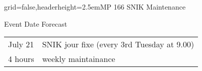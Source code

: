 \documentclass[english]{kiesgrube}
\begin{document}
\begin{poster}{grid=false,headerheight=2.5em}{}{MP 166 SNIK Maintenance}{}{}
\begin{posterbox}[name=event,column=1,below=open]{Event Date Forecast}
\begin{tabulary}{\textwidth}{lL}
July 21		&SNIK jour fixe	(every 3rd Tuesday at 9.00)\\
4 hours		&weekly maintainance\\
\end{tabulary}
\end{posterbox}
\footer
\end{poster}

\newpage
\end{document}
